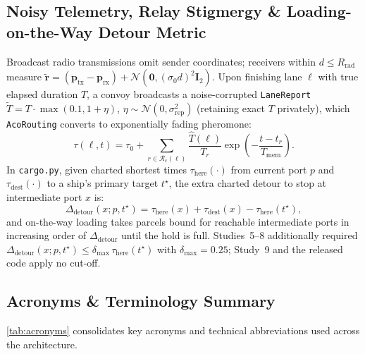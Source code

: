 \documentclass[11pt,a4paper,oneside]{report}
\begin{document}
\subsection{Noisy Telemetry, Relay Stigmergy \& Loading-on-the-Way Detour Metric}
Broadcast radio transmissions omit sender coordinates; receivers within $d \le R_{\text{rad}}$ measure $\tilde{\mathbf{r}} = (\mathbf{p}_{\text{tx}} - \mathbf{p}_{\text{rx}}) + \mathcal{N}(\mathbf{0}, (\sigma_0 d)^2 \mathbf{I}_2)$. Upon finishing lane $\ell$ with true elapsed duration $T$, a convoy broadcasts a noise-corrupted \texttt{LaneReport} $\tilde{T} = T \cdot \max(0.1, 1 + \eta)$, $\eta \sim \mathcal{N}(0, \sigma_{\text{rep}}^2)$ (retaining exact $T$ privately), which \texttt{AcoRouting} converts to exponentially fading pheromone:
\begin{equation}
\label{eq:aco-pheromone}
\tau(\ell, t) = \tau_0 + \sum_{r \in \mathcal{R}_c(\ell)} \frac{\hat{T}(\ell)}{T_r} \exp\!\left(-\frac{t - t_r}{T_{\text{mem}}}\right).
\end{equation}
In \texttt{cargo.py}, given charted shortest times $\tau_{\text{here}}(\cdot)$ from current port $p$ and $\tau_{\text{dest}}(\cdot)$ to a ship's primary target $t^\star$, the extra charted detour to stop at intermediate port $x$ is:
\begin{equation}
\label{eq:detour}
\Delta_{\text{detour}}(x; p, t^\star) = \tau_{\text{here}}(x) + \tau_{\text{dest}}(x) - \tau_{\text{here}}(t^\star),
\end{equation}
and on-the-way loading takes parcels bound for reachable intermediate ports in increasing order of $\Delta_{\text{detour}}$ until the hold is full. Studies~5--8 additionally required $\Delta_{\text{detour}}(x; p, t^\star) \le \delta_{\max}\,\tau_{\text{here}}(t^\star)$ with $\delta_{\max}=0.25$; Study~9 and the released code apply no cut-off.

\subsection{Acronyms \& Terminology Summary}
\autoref{tab:acronyms} consolidates key acronyms and technical abbreviations used across the architecture.
\end{document}
